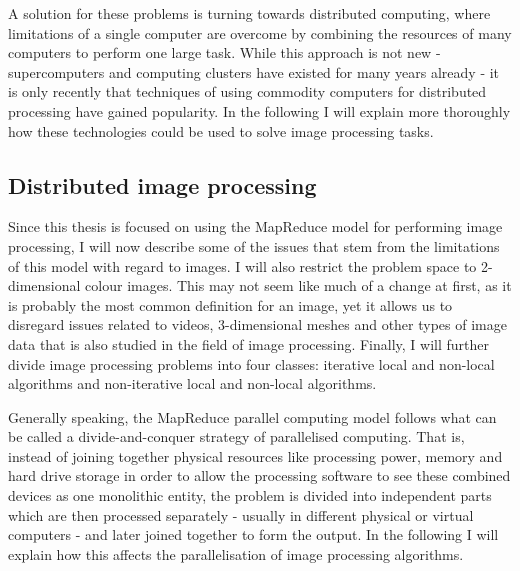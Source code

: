 \documentclass [12pt,a4paper]{report}
\begin{document}
A solution for these problems is turning towards distributed computing, where limitations of a single computer are overcome by combining the resources of many computers to perform one large task. While this approach is not new - supercomputers and computing clusters have existed for many years already - it is only recently that techniques of using commodity computers for distributed processing have gained popularity. In the following I will explain more thoroughly how these technologies could be used to solve image processing tasks.

\subsection{Distributed image processing}

Since this thesis is focused on using the MapReduce model for performing image processing, I will now describe some of the issues that stem from the limitations of this model with regard to images. I will also restrict the problem space to 2-dimensional colour images. This may not seem like much of a change at first, as it is probably the most common definition for an image, yet it allows us to disregard issues related to videos, 3-dimensional meshes and other types of image data that is also studied in the field of image processing. Finally, I will further divide image processing problems into four classes: iterative local and non-local algorithms and non-iterative local and non-local algorithms.

Generally speaking, the MapReduce parallel computing model follows what can be called a divide-and-conquer strategy of parallelised computing. That is, instead of joining together physical resources like processing power, memory and hard drive storage in order to allow the processing software to see these combined devices as one monolithic entity, the problem is divided into independent parts which are then processed separately - usually in different physical or virtual computers - and later joined together to form the output. In the following I will explain how this affects the parallelisation of image processing algorithms.
\end{document}
